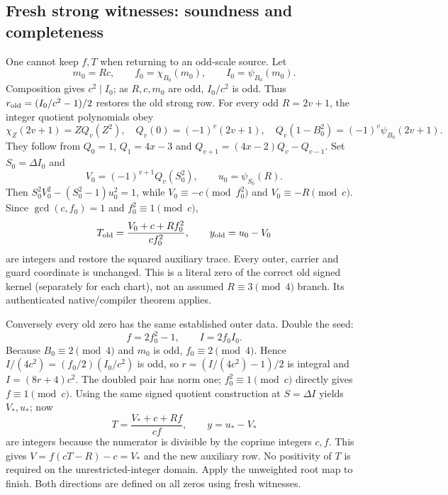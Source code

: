 \subsection{Fresh strong witnesses: soundness and completeness}
One cannot keep $f,T$ when returning to an odd-scale source. Let
\[
 m_0=Rc,\qquad f_0=\chi_{B_0}(m_0),\qquad I_0=\psi_{B_0}(m_0).
\]
Composition gives $c^2\mid I_0$; as $R,c,m_0$ are odd, $I_0/c^2$ is odd.
Thus $r_{\rm old}=(I_0/c^2-1)/2$ restores the old strong row.
For every odd $R=2v+1$, the integer quotient polynomials obey
\[
 \chi_Z(2v+1)=ZQ_v(Z^2),\quad Q_v(0)=(-1)^v(2v+1),\quad
 Q_v(1-B_0^2)=(-1)^v\psi_{B_0}(2v+1).
\]
They follow from $Q_0=1$, $Q_1=4x-3$ and
$Q_{v+1}=(4x-2)Q_v-Q_{v-1}$. Set $S_0=\Delta I_0$ and
\[
 V_0=(-1)^{v+1}Q_v(S_0^2),\qquad u_0=\psi_{S_0}(R).
\]
Then $S_0^2V_0^2-(S_0^2-1)u_0^2=1$, while
$V_0\equiv-c\pmod {f_0^2}$ and $V_0\equiv-R\pmod c$.
Since $\gcd(c,f_0)=1$ and $f_0^2\equiv1\pmod c$,
\[
 T_{\rm old}=\frac{V_0+c+Rf_0^2}{cf_0^2},\qquad y_{\rm old}=u_0-V_0
\]
are integers and restore the squared auxiliary trace. Every outer, carrier and
guard coordinate is unchanged. This is a literal zero of the correct old signed
kernel (separately for each chart), not an assumed $R\equiv3\pmod4$ branch.
Its authenticated native/compiler theorem applies.

Conversely every old zero has the same established outer data. Double the seed:
\[
 f=2f_0^2-1,\qquad I=2f_0I_0.
\]
Because $B_0\equiv2\pmod4$ and $m_0$ is odd, $f_0\equiv2\pmod4$.
Hence $I/(4c^2)=(f_0/2)(I_0/c^2)$ is odd, so
$r=(I/(4c^2)-1)/2$ is integral and $I=(8r+4)c^2$.
The doubled pair has norm one; $f_0^2\equiv1\pmod c$ directly gives $f\equiv1\pmod c$.
Using the same signed quotient construction at $S=\Delta I$ yields $V_*,u_*$;
now
\[
 T=\frac{V_*+c+Rf}{cf},\qquad y=u_*-V_*
\]
are integers because the numerator is divisible by the coprime integers $c,f$.
This gives $V=f(cT-R)-c=V_*$ and the new auxiliary row. No positivity of $T$
is required on the unrestricted-integer domain. Apply the unweighted root map
to finish. Both directions are defined on all zeros using fresh witnesses.

